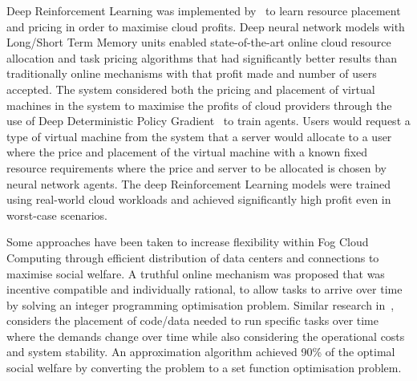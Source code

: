 Deep Reinforcement Learning was implemented by~\cite{Du2019} to learn resource placement and pricing in order to
maximise cloud profits. Deep neural network models with Long/Short Term Memory units enabled state-of-the-art online
cloud resource allocation and task pricing algorithms that had significantly better results than traditionally
online mechanisms with that profit made and number of users accepted. The system considered both the pricing and
placement of virtual machines in the system to maximise the profits of cloud providers through the use of Deep
Deterministic Policy Gradient~\citep{ddpg} to train agents. Users would request a type of virtual machine from the
system that a server would allocate to a user where the price and placement of the virtual machine with a known fixed
resource requirements where the price and server to be allocated is chosen by neural network agents. The deep
Reinforcement Learning models were trained using real-world cloud workloads and achieved significantly high profit even
in worst-case scenarios.

Some approaches have been taken to increase flexibility within Fog Cloud Computing \citep{Bi2019} through efficient
distribution of data centers and connections to maximise social welfare. A truthful online mechanism was
proposed that was incentive compatible and individually rational, to allow tasks to arrive over time by solving an
integer programming optimisation problem. Similar research in~\cite{vaji_infocom}, considers the placement of code/data
needed to run specific tasks over time where the demands change over time while also considering the operational costs
and system stability. An approximation algorithm achieved 90\% of the optimal social welfare by converting the problem
to a set function optimisation problem.

